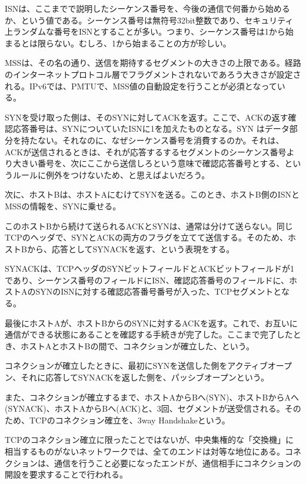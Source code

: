ISNは、ここまでで説明したシーケンス番号を、今後の通信で何番から始めるか、という値である。シーケンス番号は無符号32bit整数であり、セキュリティ上ランダムな番号をISNとすることが多い。つまり、シーケンス番号は1から始まるとは限らない。むしろ、1から始まることの方が珍しい。

MSSは、その名の通り、送信を期待するセグメントの大きさの上限である。経路のインターネットプロトコル層でフラグメントされないであろう大きさが設定される。IPv6では、PMTUで、MSS値の自動設定を行うことが必須となっている。

SYNを受け取った側は、そのSYNに対してACKを返す。ここで、ACKの返す確認応答番号は、SYNについていたISNに1を加えたものとなる。SYN はデータ部分を持たない。それなのに、なぜシーケンス番号を消費するのか。それは、ACKが送信されるときは、それが応答するするセグメントのシーケンス番号より大きい番号を、次にここから送信しろという意味で確認応答番号とする、というルールに例外をつけないため、と思えばよいだろう。

次に、ホストBは、ホストAにむけてSYNを送る。このとき、ホストB側のISNとMSSの情報を、SYNに乗せる。

このホストBから続けて送られるACKとSYNは、通常は分けて送らない。同じTCPのヘッダで、SYNとACKの両方のフラグを立てて送信する。そのため、ホストBから、応答としてSYNACKを返す、という表現をする。

SYNACKは、TCPヘッダのSYNビットフィールドとACKビットフィールドが1であり、シーケンス番号のフィールドにISN、確認応答番号のフィールドに、ホストAのSYNのISNに対する確認応答番号番号が入った、TCPセグメントとなる。

最後にホストAが、ホストBからのSYNに対するACKを返す。これで、お互いに通信ができる状態にあることを確認する手続きが完了した。ここまで完了したとき、ホストAとホストBの間で、コネクションが確立した、という。

コネクションが確立したときに、最初にSYNを送信した側をアクティブオープン、それに応答してSYNACKを返した側を、パッシブオープンという。

また、コネクションが確立するまで、ホストAからBへ(SYN)、ホストBからAへ(SYNACK)、ホストAからBへ(ACK)と、3回、セグメントが送受信される。そのため、TCPのコネクション確立を、3way Handshakeという。

TCPのコネクション確立に限ったことではないが、中央集権的な「交換機」に相当するものがないネットワークでは、全てのエンドは対等な地位にある。コネクションは、通信を行うこと必要になったエンドが、通信相手にコネクションの開設を要求することで行われる。

